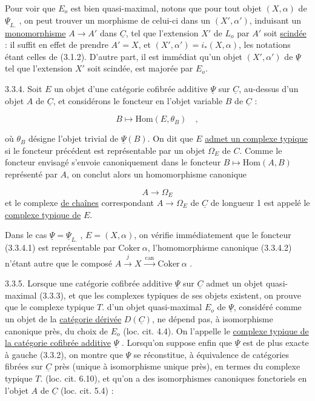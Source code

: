 Pour voir que $E_o$ est bien quasi-maximal, notons que pour tout objet $(X,\alpha)$ de $\underline{\Psi}_{L.}$ , on peut trouver un morphisme de celui-ci dans un $(X',\alpha')$, induisant un \underline{monomorphisme} $A \longrightarrow A'$ dans $\underline{C}$, tel que l'extension $X'$ de $L_o$ par $A'$ soit \underline{scindée} : il suffit en effet de prendre $A'=X$, et $(X',\alpha') = i_*(X,\alpha)$, les notations étant celles de (3.1.2). D'autre part, il est immédiat qu'un objet $(X',\alpha')$ de $\underline{\Psi}$ tel que l'extension $X'$ soit scindée, est majorée par $E_o$.

3.3.4. Soit $E$ un objet d'une catégorie cofibrée additive $\underline{\Psi}$ sur $\underline{C}$, au-dessus d'un objet $A$ de $\underline{C}$, et considérons le foncteur en l'objet variable $B$ de $\underline{C}$ :

\begin{equation}\tag{3.3.4.1}
B \longmapsto \mathrm{Hom}(E,\theta_B) \quad , 
\end{equation}

 où $\theta_B$ désigne l'objet trivial de $\underline{\Psi}(B)$. On dit que $E$ \underline{admet un complexe typique} si le foncteur précédent est représentable par un objet $\Omega_E$ de $C$. Comme le foncteur envisagé s'envoie canoniquement dans le foncteur $B \longmapsto \mathrm{Hom}(A,B)$ représenté par $A$, on conclut alors un homomorphisme canonique

\begin{equation}\tag{3.3.4.2}
A \longrightarrow \Omega_E
\end{equation}
et le complexe \underline{de chaînes} correspondant $A \longrightarrow \Omega_E$ de $\underline{C}$ de longueur 1 est appelé le \underline{complexe typique de} $E$.

Dans le cas $\underline{\Psi} = \underline{\Psi}_{L.}$ , $E = (X,\alpha)$, on vérifie immédiatement que le foncteur (3.3.4.1) est représentable par $\mathrm{Coker}\ \alpha$, l'homomorphisme canonique (3.3.4.2) n'étant autre que le composé $A \xrightarrow{\ j\ } X \xrightarrow{\ \mathrm{can}\ } \mathrm{Coker}\ \alpha$ .

3.3.5. Lorsque une catégorie cofibrée additive $\underline{\Psi}$ sur $\underline{C}$ admet un objet quasi-maximal (3.3.3), et que les complexes typiques de ses objets existent, on prouve que le complexe typique $T.$ d'un objet quasi-maximal $E_o$ de $\underline{\Psi}$, considéré comme un objet de la \underline{catégorie dérivée} $D(\underline{C})$, ne dépend pas, à isomorphisme canonique près, du choix de $E_o$ (loc. cit. 4.4). On l'appelle le \underline{complexe typique de la catégorie cofibrée additive} $\underline{\Psi}$ . Lorsqu'on suppose enfin que $\underline{\Psi}$ est de plus exacte à gauche (3.3.2), on montre que $\underline{\Psi}$ se réconstitue, à équivalence de catégories fibrées sur $\underline{C}$ près (unique à isomorphisme unique près), en termes du complexe typique $T.$ (loc. cit. 6.10), et qu'on a des isomorphismes canoniques fonctoriels en l'objet $A$ de $\underline{C}$ (loc. cit. 5.4) :

